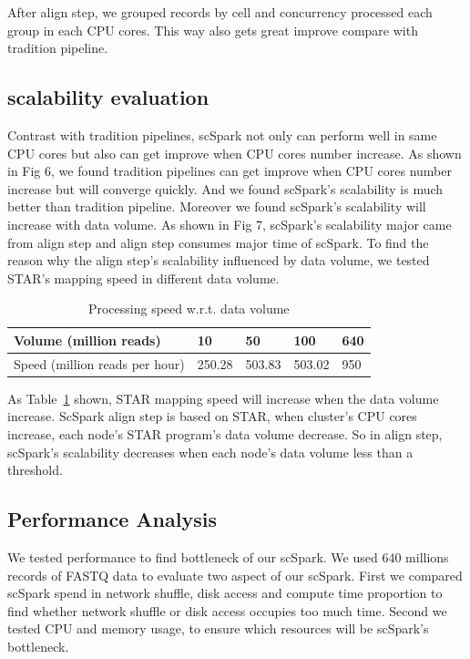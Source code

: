 \documentclass[conference]{IEEEtran}
\begin{document}
After align step, we grouped records by cell and concurrency processed each group in each CPU cores.
This way also gets great improve compare with tradition pipeline.

\subsection{scalability evaluation}
Contrast with tradition pipelines, scSpark not only can perform well in same CPU cores but also can get improve when CPU cores number increase.
As shown in Fig 6, we found tradition pipelines can get improve when CPU cores number increase but will converge quickly.
And we found scSpark's scalability is much better than tradition pipeline.
Moreover we found scSpark's scalability will increase with data volume.
As shown in Fig 7, scSpark's scalability major came from align step and align step consumes major time of scSpark.
To find the reason why the align step's scalability influenced by data volume, we tested STAR's mapping speed in different data volume.
\begin{table}
  \centering
  \caption{Processing speed w.r.t. data volume}\label{tab3}
	\begin{tabular}{|l | l | l | l | l|}
	\hline
	Volume (million reads) & 10 & 50 & 100 & 640 \\
	\hline
	Speed (million reads per hour) & 250.28 & 503.83 & 503.02 & 950 \\
	\hline
  \end{tabular}
\end{table}
As Table~\ref{tab3} shown, STAR mapping speed will increase when the data volume increase. 
ScSpark align step is based on STAR, when cluster's CPU cores increase, each node's STAR program's data volume decrease.
So in align step, scSpark's scalability decreases when each node's data volume less than a threshold.

\subsection{Performance Analysis}
We tested performance to find bottleneck of our scSpark.
We used 640 millions records of FASTQ data to evaluate two aspect of our scSpark.
First we compared scSpark spend in network shuffle, disk access and compute time proportion to find whether network shuffle or disk access occupies too much time.
Second we tested CPU and memory usage, to ensure which resources will be scSpark's bottleneck.
  
\end{document}
